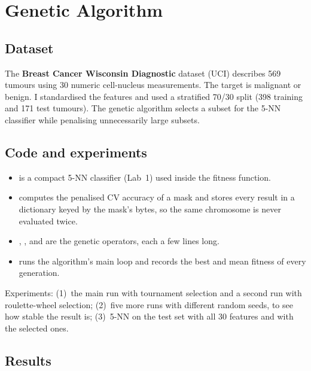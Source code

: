 \chapter{Genetic Algorithm}


\section{Dataset}
The \textbf{Breast Cancer Wisconsin Diagnostic} dataset (UCI) describes 569 tumours using 30 numeric
cell-nucleus measurements. The target is malignant or benign. I standardised the features and used a
stratified 70/30 split (398 training and 171 test tumours). The genetic algorithm selects a subset for
the 5-NN classifier while penalising unnecessarily large subsets.

\section{Code and experiments}
\begin{itemize}
\item {} is a compact 5-NN classifier (Lab~1) used inside the fitness function.
\item {} computes the penalised CV accuracy of a mask and stores every result in a dictionary
      keyed by the mask's bytes, so the same chromosome is never evaluated twice.
\item {}, ,  and 
      are the genetic operators, each a few lines long.
\item {} runs the algorithm's main loop and records the best and mean fitness of
      every generation.
\end{itemize}
\noindent Experiments: (1)~the main run with tournament selection and a second run with roulette-wheel
selection; (2)~five more runs with different random seeds, to see how stable the result is;
(3)~5-NN on the test set with all 30 features and with the selected ones.

\section{Results}

